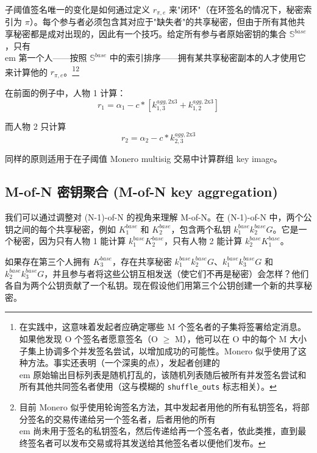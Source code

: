 子阈值签名唯一的变化是如何通过定义 $r_{\pi,e}$ 来"闭环"（在环签名的情况下，秘密索引为 $\pi$）。每个参与者必须包含其对应于"缺失者"的共享秘密，但由于所有其他共享秘密都是成对出现的，因此有一个技巧。给定所有参与者原始密钥的集合 $\mathbb{S}^{base}$，只有{\\em 第一个人}——按照 $\mathbb{S}^{base}$ 中的索引排序——拥有某共享秘密副本的人才使用它来计算他的 $r_{\pi,e}$。\footnote{在实践中，这意味着发起者应确定哪些 M 个签名者的子集将签署给定消息。如果他发现 O 个签名者愿意签名（O $\geq$ M），他可以在 O 中的每个 M 大小子集上协调多个并发签名尝试，以增加成功的可能性。Monero 似乎使用了这种方法。事实还表明（一个深奥的点），发起者创建的{\\em 原始}输出目标列表是随机打乱的，该随机列表随后被所有并发签名尝试和所有其他共同签名者使用（这与模糊的 {\tt shuffle\_outs} 标志相关）。}\footnote{目前 Monero 似乎使用轮询签名方法，其中发起者用他的所有私钥签名，将部分签名的交易传递给另一个签名者，后者用他的所有{\\em 尚未用于签名的}私钥签名，然后传递给再一个签名者，依此类推，直到最终签名者可以发布交易或将其发送给其他签名者以便他们发布。}

在前面的例子中，人物 1 计算：\vspace{.175cm}
\[r_1 = \alpha_1 - c*[k^{agg,\textrm{2x3}}_{1,3} + k^{agg,\textrm{2x3}}_{1,2}]\] 

而人物 2 只计算
\[r_2 = \alpha_2 - c*k^{agg,\textrm{2x3}}_{2,3}\]

同样的原则适用于在子阈值 Monero multisig 交易中计算群组 key image。


\subsection{M-of-N 密钥聚合 (M-of-N key aggregation)}
\label{sec:m-of-n}

我们可以通过调整对 (N-1)-of-N 的视角来理解 M-of-N。在 (N-1)-of-N 中，两个公钥之间的每个共享秘密，例如 $K^{base}_1$ 和 $K^{base}_2$，包含两个私钥 $k^{base}_1 k^{base}_2 G$。它是一个秘密，因为只有人物 1 能计算 $k^{base}_1 K^{base}_2$，只有人物 2 能计算 $k^{base}_2 K^{base}_1$。

如果存在第三个人拥有 $K^{base}_3$，存在共享秘密 $k^{base}_1 k^{base}_2 G$、$k^{base}_1 k^{base}_3 G$ 和 $k^{base}_2 k^{base}_3 G$，并且参与者将这些公钥互相发送（使它们不再是秘密）会怎样？他们各自为两个公钥贡献了一个私钥。现在假设他们用第三个公钥创建一个新的共享秘密。

